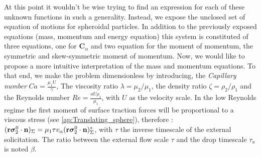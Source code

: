 At this point it wouldn't be wise trying to find an expression for each of these unknown functions in such a generality. 
Instead, we expose the unclosed set of equation of motions for spheroidal particles. 
In addition to the previously exposed equations (mass, momentum and energy equation) this system is constituted of three equations, one for $\textbf{C}_\alpha$ and two equation for the moment of momentum, the symmetric and skew-symmetric moment of momentum. 
Now, we would like to propose a more intuitive interpretation of the mass and momentum equations.
To that end, we make the problem dimensionless by introducing, 
the \textit{Capillary number} $Ca= \frac{\mu_1 U}{\gamma}$, The viscosity ratio $\lambda = \mu_2/\mu_1$, the density ratio $\zeta = \rho_2/\rho_1$ and the Reynolds number $Re = \frac{a U \rho_1}{\mu_1}$, with $U$ as the velocity scale. 
In the low Reynolds regime the first moment of surface traction forces will be proportional to a viscous stress (see \ref{ap:Translating_sphere}), therefore :$( \textbf{r}\bm\sigma_2^0\cdot \textbf{n} )_{\Sigma} =\mu_1  \tau v_\alpha ( \textbf{r}\bm\sigma_2^0\cdot \textbf{n} )_{\Sigma}^*$, with $\tau$ the inverse timescale of the external solicitation.
The ratio between the external flow scale $\tau$ and the drop timescale $\tau_a$ is noted $\beta$. 

